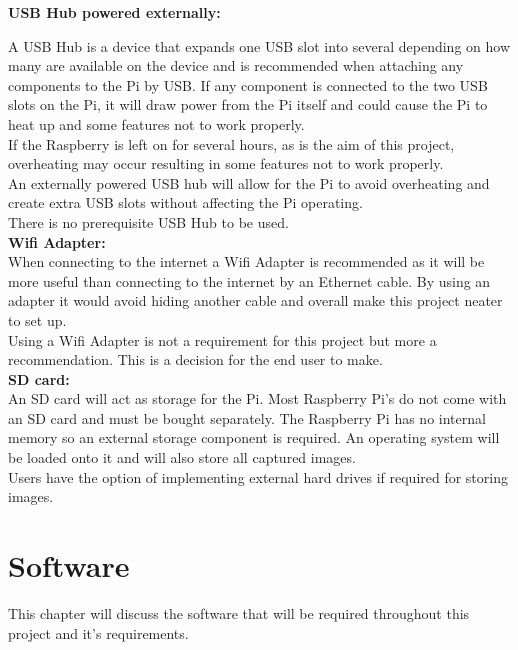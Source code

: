 \documentclass[12pt]{report}
\begin{document}
\noindent
{\bf USB Hub powered externally:}\\
\break

A USB Hub is a device that expands one USB slot into several depending on how many are available on the device and is recommended when attaching any components to the Pi by USB. If any component is connected to the two USB slots on the Pi, it will draw power from the Pi itself and could cause the Pi to heat up and some features not to work properly. \\

If the Raspberry is left on for several hours, as is the aim of this project, overheating may occur resulting in some features not to work properly.\\ 


An externally powered USB hub will allow for the Pi to avoid overheating and create extra USB slots without affecting the Pi operating.\\ 

There is no prerequisite USB Hub to be used.\\

\noindent
{\bf Wifi Adapter:}\\
\break
When connecting to the internet a Wifi Adapter is recommended as it will be more useful than connecting to the internet by an Ethernet cable. By using an adapter it would avoid hiding another cable and overall make this project neater to set up.\\

Using a Wifi Adapter is not a requirement for this project but  more a recommendation. This is a decision for the end user to make.\\

\noindent
{\bf SD card:}\\
\break
An SD card will act as storage for the Pi. Most Raspberry Pi's do not come with an SD card and must be bought separately. The Raspberry Pi has no internal memory so an external storage component is required. An operating system will be loaded onto it and will also store all captured images.\\

Users have the option of implementing external hard drives if required for storing images.\\



\clearpage
\section{Software}	
\label{sec:software}	
This chapter will discuss the software that will be required throughout this project and it's requirements.\\
\end{document}
